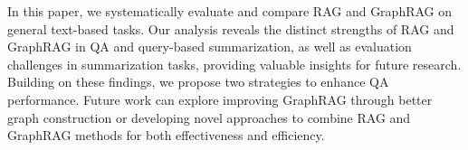 In this paper, we systematically evaluate and compare RAG and GraphRAG on general text-based tasks. Our analysis reveals the distinct strengths of RAG and GraphRAG in QA and query-based summarization, as well as evaluation challenges in summarization tasks, providing valuable insights for future research. Building on these findings, we propose two strategies to enhance QA performance. Future work can explore improving GraphRAG through better graph construction or developing novel approaches to combine RAG and GraphRAG methods for both effectiveness and efficiency.